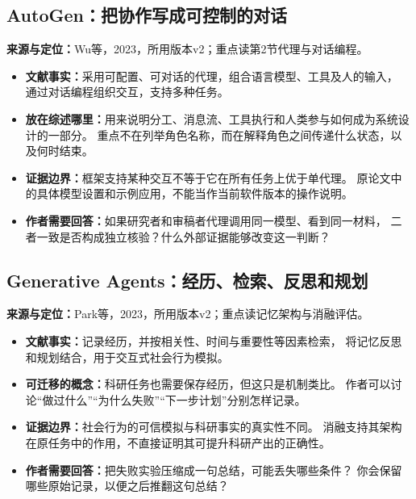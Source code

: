 \documentclass[UTF8,fontset=fandol,12pt,a4paper]{ctexart}
\begin{document}
\subsection{AutoGen：把协作写成可控制的对话}
\noindent\textbf{来源与定位：}Wu等，2023，所用版本v2；重点读第2节代理与对话编程\cite{autogen}。
\begin{itemize}
\item \textbf{文献事实：}采用可配置、可对话的代理，组合语言模型、工具及人的输入，
通过对话编程组织交互，支持多种任务。
\item \textbf{放在综述哪里：}用来说明分工、消息流、工具执行和人类参与如何成为系统设计的一部分。
重点不在列举角色名称，而在解释角色之间传递什么状态，以及何时结束。
\item \textbf{证据边界：}框架支持某种交互不等于它在所有任务上优于单代理。
原论文中的具体模型设置和示例应用，不能当作当前软件版本的操作说明。
\item \textbf{作者需要回答：}如果研究者和审稿者代理调用同一模型、看到同一材料，
二者一致是否构成独立核验？什么外部证据能够改变这一判断？
\end{itemize}

\subsection{Generative Agents：经历、检索、反思和规划}
\noindent\textbf{来源与定位：}Park等，2023，所用版本v2；重点读记忆架构与消融评估\cite{generative}。
\begin{itemize}
\item \textbf{文献事实：}记录经历，并按相关性、时间与重要性等因素检索，
将记忆反思和规划结合，用于交互式社会行为模拟。
\item \textbf{可迁移的概念：}科研任务也需要保存经历，但这只是机制类比。
作者可以讨论“做过什么”“为什么失败”“下一步计划”分别怎样记录。
\item \textbf{证据边界：}社会行为的可信模拟与科研事实的真实性不同。
消融支持其架构在原任务中的作用，不直接证明其可提升科研产出的正确性。
\item \textbf{作者需要回答：}把失败实验压缩成一句总结，可能丢失哪些条件？
你会保留哪些原始记录，以便之后推翻这句总结？
\end{itemize}

\clearpage
\end{document}
